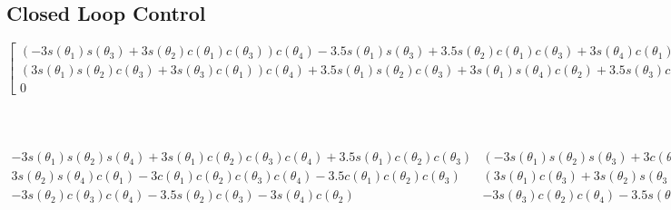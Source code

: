 \documentclass[12pt]{article}
\begin{document}
\begin{landscape}
\subsection{Closed Loop Control}
$\left[\begin{matrix}\left(- 3 s{\left(\theta_{1} \right)} s{\left(\theta_{3} \right)} + 3 s{\left(\theta_{2} \right)} c{\left(\theta_{1} \right)} c{\left(\theta_{3} 
\right)}\right) c{\left(\theta_{4} \right)} - 3.5 s{\left(\theta_{1} \right)} s{\left(\theta_{3} \right)} + 3.5 s{\left(\theta_{2} \right)} c{\left(\theta_{1} \right)} c{\left(\theta_{3} \right)} + 3 s{\left(\theta_{4} \right)} c{\left(\theta_{1} \right)} c{\left(\theta_{2} \right)}\\\left(3 s{\left(\theta_{1} \right)} s{\left(\theta_{2} \right)} c{\left(\theta_{3} \right)} + 3 s{\left(\theta_{3} \right)} c{\left(\theta_{1} \right)}\right) c{\left(\theta_{4} \right)} + 3.5 s{\left(\theta_{1} \right)} s{\left(\theta_{2} \right)} c{\left(\theta_{3} \right)} + 3 s{\left(\theta_{1} \right)} s{\left(\theta_{4} \right)} c{\left(\theta_{2} \right)} + 3.5 s{\left(\theta_{3} \right)} c{\left(\theta_{1} \right)}\\0\end{matrix}\right.$\\\\\\\\
$\begin{matrix}- 3 s{\left(\theta_{1} \right)} s{\left(\theta_{2} \right)} s{\left(\theta_{4} \right)} + 3 s{\left(\theta_{1} \right)} c{\left(\theta_{2} \right)} c{\left(\theta_{3} \right)} c{\left(\theta_{4} \right)} + 3.5 s{\left(\theta_{1} \right)} c{\left(\theta_{2} \right)} c{\left(\theta_{3} \right)} & \left(- 3 s{\left(\theta_{1} \right)} s{\left(\theta_{2} \right)} s{\left(\theta_{3} \right)} + 3 c{\left(\theta_{1} \right)} c{\left(\theta_{3} \right)}\right) c{\left(\theta_{4} \right)} - 3.5 s{\left(\theta_{1} \right)} s{\left(\theta_{2} \right)} s{\left(\theta_{3} \right)} + 3.5 c{\left(\theta_{1} \right)} c{\left(\theta_{3} \right)}\\3 s{\left(\theta_{2} \right)} s{\left(\theta_{4} \right)} c{\left(\theta_{1} \right)} - 3 c{\left(\theta_{1} \right)} c{\left(\theta_{2} \right)} c{\left(\theta_{3} \right)} c{\left(\theta_{4} \right)} - 3.5 c{\left(\theta_{1} \right)} c{\left(\theta_{2} \right)} c{\left(\theta_{3} \right)} & \left(3 s{\left(\theta_{1} \right)} c{\left(\theta_{3} \right)} + 3 s{\left(\theta_{2} \right)} s{\left(\theta_{3} \right)} c{\left(\theta_{1} \right)}\right) c{\left(\theta_{4} \right)} + 3.5 s{\left(\theta_{1} \right)} c{\left(\theta_{3} \right)} + 3.5 s{\left(\theta_{2} \right)} s{\left(\theta_{3} \right)} c{\left(\theta_{1} \right)}\\- 3 s{\left(\theta_{2} \right)} c{\left(\theta_{3} \right)} c{\left(\theta_{4} \right)} - 3.5 s{\left(\theta_{2} \right)} c{\left(\theta_{3} \right)} - 3 s{\left(\theta_{4} \right)} c{\left(\theta_{2} \right)} & - 3 s{\left(\theta_{3} \right)} c{\left(\theta_{2} \right)} c{\left(\theta_{4} \right)} - 3.5 s{\left(\theta_{3} \right)} c{\left(\theta_{2} \right)}\end{matrix}$

\end{landscape}
\end{document}
